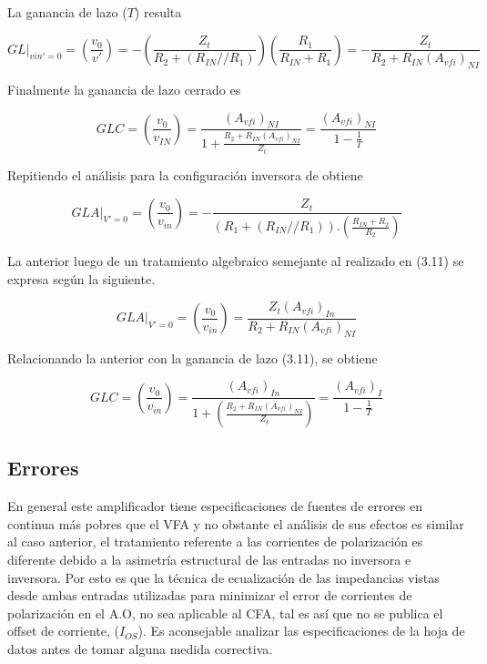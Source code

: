 La ganancia de lazo ($T$) resulta

\begin{equation}
GL|_{vin'=0} = \left( \frac{v_0}{v'} \right) = - \left( \frac{Z_t}{R_2 + (R_{IN} // R_1)} \right) \left( \frac{R_1}{R_{IN} + R_1} \right) = - \frac{Z_t}{R_2 + R_{IN} (A_{vfi})_{NI}}
\label{eq:3.11}
\end{equation}

Finalmente la ganancia de lazo cerrado es

\begin{equation}
GLC = \left( \frac{v_0}{v_{IN}} \right) = \frac{(A_{vfi})_{NI}}{1 + \frac{R_2 + R_{IN}(A_{vfi})_{NI}}{Z_t}} = \frac{(A_{vfi})_{NI}}{1 - \frac{1}{T}}
\label{eq:3.12}
\end{equation}

Repitiendo el análisis para la configuración inversora de obtiene

$$
GLA|_{V'=0} = \left( \frac{v_0}{v_{in}} \right) = - \frac{Z_t}{(R_1 + (R_{IN} // R_1)).(\frac{R_{IN} + R_2}{R_2})}
$$

La anterior luego de un tratamiento algebraico semejante al realizado en (3.11) se expresa según la siguiente.

\begin{equation}
GLA|_{V'=0} = \left( \frac{v_0}{v_{in}} \right) = \frac{Z_t (A_{vfi})_{In}}{R_2 + R_{IN} (A_{vfi})_{NI}}
\label{eq:3.13}
\end{equation}

Relacionando la anterior con la ganancia de lazo (3.11), se obtiene

\begin{equation}
GLC = \left( \frac{v_0}{v_{in}} \right) = \frac{(A_{vfi})_{In}}{1 + (\frac{R_2 + R_{IN}(A_{vfi})_{NI}}{Z_t})} = \frac{(A_{vfi})_I}{1 - \frac{1}{T}}
\label{eq:3.14}
\end{equation}
\subsection{Errores}
En general este amplificador tiene especificaciones de fuentes de errores en continua más pobres que el VFA y no obstante el análisis de sus efectos es similar al caso anterior, el tratamiento referente a las corrientes de polarización es diferente debido a la asimetría estructural de las entradas no inversora e inversora. Por esto es que la técnica de ecualización de las impedancias vistas desde ambas entradas utilizadas para minimizar el error de corrientes de polarización en el A.O, no sea aplicable al CFA, tal es así que no se publica el offset de corriente, ($I_{OS}$). Es aconsejable analizar las especificaciones de la hoja de datos antes de tomar alguna medida correctiva.

